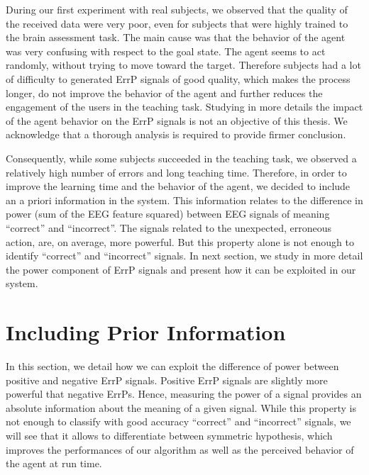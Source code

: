 During our first experiment with real subjects, we observed that the quality of the received data were very poor, even for subjects that were highly trained to the brain assessment task. The main cause was that the behavior of the agent was very confusing with respect to the goal state. The agent seems to act randomly, without trying to move toward the target. Therefore subjects had a lot of difficulty to generated ErrP signals of good quality, which makes the process longer, do not improve the behavior of the agent and further reduces the engagement of the users in the teaching task. Studying in more details the impact of the agent behavior on the ErrP signals is not an objective of this thesis. We acknowledge that a thorough analysis is required to provide firmer conclusion.

Consequently, while some subjects succeeded in the teaching task, we observed a relatively high number of errors and long teaching time. Therefore, in order to improve the learning time and the behavior of the agent, we decided to include an a priori information in the system. This information relates to the difference in power (sum of the EEG feature squared) between EEG signals of meaning ``correct'' and ``incorrect''. The signals related to the unexpected, erroneous action, are, on average, more powerful. But this property alone is not enough to identify ``correct'' and ``incorrect'' signals. In next section, we study in more detail the power component of ErrP signals and present how it can be exploited in our system.

\section{Including Prior Information}
\label{chapter:bci:priorpower}

In this section, we detail how we can exploit the difference of power between positive and negative ErrP signals. Positive ErrP signals are slightly more powerful that negative ErrPs. Hence, measuring the power of a signal provides an absolute information about the meaning of a given signal. While this property is not enough to classify with good accuracy ``correct'' and ``incorrect'' signals, we will see that it allows to differentiate between symmetric hypothesis, which improves the performances of our algorithm as well as the perceived behavior of the agent at run time.

